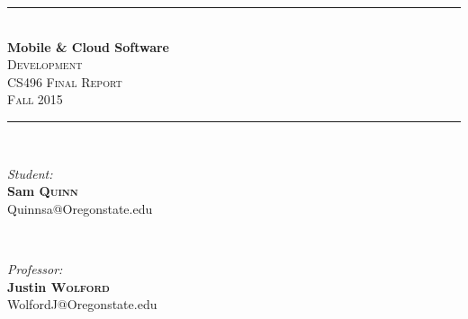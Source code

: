 \documentclass[letterpaper,12pt,notitlepage,fleqn]{article}
\begin{document}
\begin{titlepage}
\vspace*{\fill}

\newcommand{\HRule}{\rule{\linewidth}{0.5mm}} %

\center %


\HRule \\[0.4cm]
{ \huge \bfseries Mobile \& Cloud Software}\\[0.4cm] %


\textsc{\LARGE Development}\\[0.5cm] %
\textsc{\Large CS496 Final Report}\\[0.5cm] %
\textsc{\large Fall 2015}\\[0.5cm] %


\HRule \\[1.5cm]

\begin{minipage}{0.4\textwidth}
\begin{flushleft} \large
\emph{Student:}\\
        \textbf{Sam \textsc{Quinn}} \\ %
        {\small Quinnsa@Oregonstate.edu}
        \end{flushleft}
        \end{minipage}
        ~
        \begin{minipage}{0.4\textwidth}
        \begin{flushright} \large
        \emph{Professor:} \\
            \textbf{Justin \textsc{Wolford}} \\ %
            {\small WolfordJ@Oregonstate.edu}
            \end{flushright}
            \end{minipage}\\[3cm]


\end{titlepage}
\end{document}
